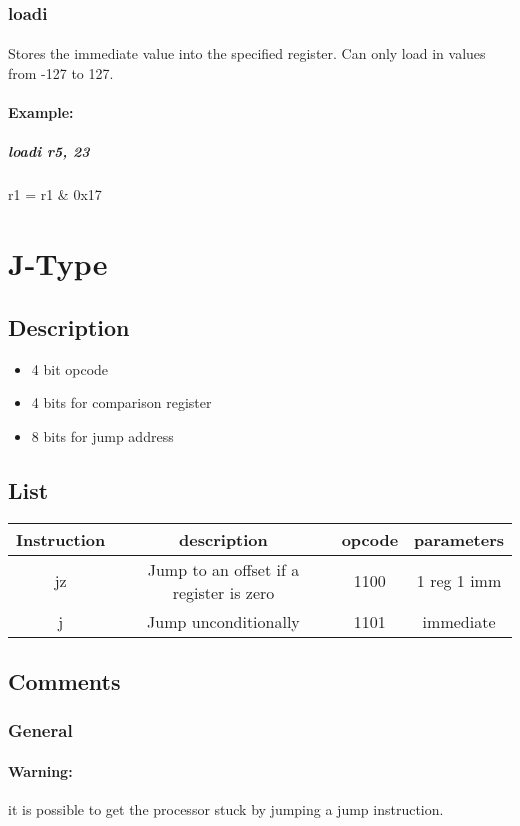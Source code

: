 \documentclass[a4paper]{article}
\begin{document}
\subsubsection{loadi}
\paragraph{} Stores the immediate value into the specified register. Can only load in values from -127 to 127.
\paragraph{Example:}
\subparagraph{loadi r5, 23} r1 = r1 \& 0x17

\section{J-Type}
\subsection{Description}
\begin{itemize}
\item 4 bit opcode
\item 4 bits for comparison register
\item 8 bits for jump address
\end{itemize}

\subsection{List}
\begin{center}
\begin{tabular}{| c | c | c | c |}
\hline
Instruction & description & opcode & parameters \\ \hline
jz & Jump to an offset if a register is zero & 1100 & 1 reg 1 imm \\ \hline
j & Jump unconditionally & 1101 & immediate \\ \hline
\end{tabular}
\end{center}

\subsection{Comments}
\subsubsection{General}
\paragraph{Warning:} it is possible to get the processor stuck by jumping a jump instruction.
\end{document}

